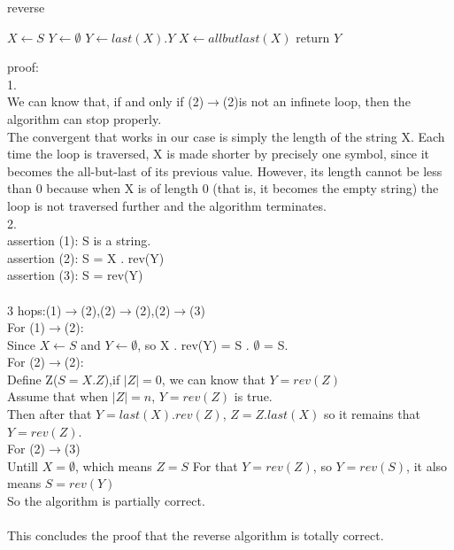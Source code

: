 \documentclass[a4paper, justified]{tufte-handout}
\begin{document}
\begin{solution}
  \begin{algorithm}
    \caption{reverse}
    \label{alg:sum}
    \begin{algorithmic}[1]
      \State $X \gets S$
      \State $Y \gets \emptyset$
      \State $Y \gets last(X) . Y$
      \State $X \gets all but last(X)$
      \EndWhile
      \State return $Y$
      \EndProcedure
    \end{algorithmic}
  \end{algorithm}
\end{solution}
proof:\\
1.\\
We can know that, if and only if (2)$\rightarrow$(2)is not an infinete loop, then the algorithm can stop properly.\\
The convergent that works in our case is simply the length of the string X. Each time the loop is traversed, X is made shorter by precisely one symbol, since it becomes the all-but-last of its previous value. However, its length cannot be less than 0 because when X is of length 0 (that is, it becomes the empty string) the loop is not traversed further and the algorithm terminates.\\
2.\\
assertion (1): S is a string.\\
assertion (2): S = X . rev(Y)\\
assertion (3): S = rev(Y)\\
\\
3 hops:(1)$\rightarrow$(2),(2)$\rightarrow$(2),(2)$\rightarrow$(3)\\
For (1)$\rightarrow$(2):\\
Since $X \gets S$ and $Y \gets \emptyset$, so X . rev(Y) = S . $ \emptyset$ = S.\\
For (2)$\rightarrow$(2):\\
Define Z($S = X.Z$),if $|Z| = 0$, we can know that $Y = rev(Z)$\\
Assume that when $|Z| = n$, $Y = rev(Z)$ is true.\\
Then after that $Y = last(X).rev(Z)$, $Z = Z.last(X)$
so it remains that $Y = rev(Z)$.\\
For (2)$\rightarrow$(3)\\
Untill $X = \emptyset$, which means $Z=S$
For that $Y = rev(Z)$, so $Y = rev (S)$, it also means $S = rev(Y)$\\
So  the algorithm is partially correct.\\
\\
This concludes the proof that the reverse algorithm is totally correct.
\end{document}
